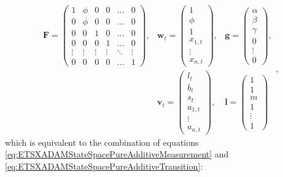 \documentclass[
]{book}
\theoremstyle{definition}
\theoremstyle{definition}
\theoremstyle{definition}
\theoremstyle{definition}
\theoremstyle{remark}
\begin{document}
\begin{equation}
  \begin{aligned}
    \mathbf{F} =
    \begin{pmatrix} 1 & \phi & 0 & 0 & \dots & 0 \\
                    0 & \phi & 0 & 0 & \dots & 0 \\
                    0 & 0 & 1 & 0 & \dots & 0 \\
                    0 & 0 & 0 & 1 & \dots & 0 \\
                    \vdots & \vdots & \vdots & \vdots & \ddots & \vdots \\
                    0 & 0 & 0 & 0 & \dots & 1
    \end{pmatrix},
    & \mathbf{w}_t = \begin{pmatrix} 1 \\ \phi \\ 1 \\ x_{1,t} \\ \vdots \\x_{n,t} \end{pmatrix},
    & \mathbf{g} = \begin{pmatrix} \alpha \\ \beta \\ \gamma \\ 0 \\ \vdots \\ 0 \end{pmatrix}, \\
    & \mathbf{v}_{t} = \begin{pmatrix} l_t \\ b_t \\ s_t \\ a_{1,t} \\ \vdots \\ a_{n,t} \end{pmatrix},
    & \mathbf{l} = \begin{pmatrix} 1 \\ 1 \\ m \\ 1 \\ \vdots \\ 1 \end{pmatrix}
  \end{aligned},
  \label{eq:ETSXADAMAAAMatrices}
\end{equation}
which is equivalent to the combination of equations \eqref{eq:ETSXADAMStateSpacePureAdditiveMeasurement} and \eqref{eq:ETSXADAMStateSpacePureAdditiveTransition}:
\end{document}
